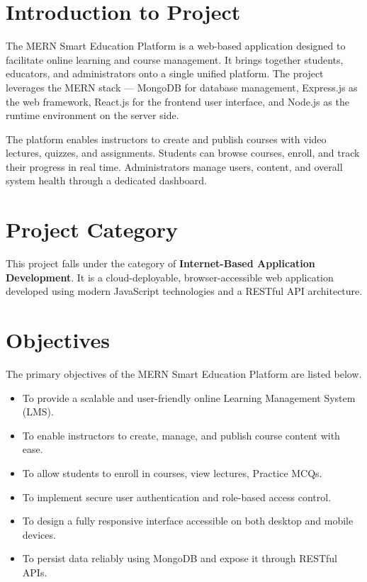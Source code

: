 \documentclass[12pt, a4paper, oneside]{report}
\begin{document}

\section{Introduction to Project}

The MERN Smart Education Platform is a web-based application designed to facilitate online learning and course management. It brings together students, educators, and administrators onto a single unified platform. The project leverages the MERN stack --- MongoDB for database management, Express.js as the web framework, React.js for the frontend user interface, and Node.js as the runtime environment on the server side.

The platform enables instructors to create and publish courses with video lectures, quizzes, and assignments. Students can browse courses, enroll, and track their progress in real time. Administrators manage users, content, and overall system health through a dedicated dashboard.

\section{Project Category}

This project falls under the category of \textbf{Internet-Based Application Development}. It is a cloud-deployable, browser-accessible web application developed using modern JavaScript technologies and a RESTful API architecture.

\section{Objectives}

The primary objectives of the MERN Smart Education Platform are listed below.

\begin{itemize}[leftmargin=1.5cm, itemsep=2pt]
  \item To provide a scalable and user-friendly online Learning Management System (LMS).
  \item To enable instructors to create, manage, and publish course content with ease.
  \item To allow students to enroll in courses, view lectures, Practice MCQs.
  \item To implement secure user authentication and role-based access control.
  \item To design a fully responsive interface accessible on both desktop and mobile devices.
  \item To persist data reliably using MongoDB and expose it through RESTful APIs.
\end{itemize}
\end{document}
